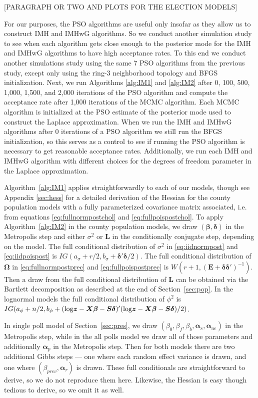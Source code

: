 \documentclass[12pt]{article}
\def\log{\hbox{log}}
\begin{document}
[PARAGRAPH OR TWO AND PLOTS FOR THE ELECTION MODELS]

For our purposes, the PSO algorithms are useful only insofar as they allow us to construct IMH and IMHwG algorithms. So we conduct another simulation study to see when each algorithm gets close enough to the posterior mode for the IMH and IMHwG algorithms to have high acceptance rates. To this end we conduct another simulations study using the same 7 PSO algorithms from the previous study, except only using the ring-3 neighborhood topology and BFGS initialization. Next, we run Algorithms \ref{alg:IM1} and \ref{alg:IM2} after 0, 100, 500, 1,000, 1,500, and 2,000 iterations of the PSO algorithm and compute the acceptance rate after 1,000 iterations of the MCMC algorithm. Each MCMC algorithm is initialized at the PSO estimate of the posterior mode used to construct the Laplace approximation. When we run the IMH and IMHwG algorithms after 0 iterations of a PSO algorithm we still run the BFGS initialization, so this serves as a control to see if running the PSO algorithm is necessary to get reasonable acceptance rates. Additionally, we run each IMH and IMHwG algorithm with different choices for the degrees of freedom parameter in the Laplace approximation.

Algorithm~\ref{alg:IM1} applies straightforwardly to each of our models, though see Appendix \ref{sec:hess} for a detailed derivation of the Hessian for the county population models with a fully parameterized covariance matrix associated, i.e. from equations \eqref{eq:fullnormpostchol} and \eqref{eq:fullpoispostchol}. To apply Algorithm~\ref{alg:IM2} in the county population models, we draw $(\bm{\beta},\bm{\delta})$ in the Metropolis step and either $\sigma^2$ or $\bm{L}$ in the conditionally conjugate step, depending on the model. The full conditional distribution of $\sigma^2$ in \eqref{eq:iidnormpost} and \eqref{eq:iidpoispost} is $IG(a_{\sigma} + r/2, b_{\sigma} + \bm{\delta}'\bm{\delta}/2)$. The full conditional distribution of $\bm{\Omega}$ in \eqref{eq:fullnormpostprec} and \eqref{eq:fullpoispostprec} is $W(r + 1, (\bm{E} + \bm{\delta}\bm{\delta}')^{-1})$. Then a draw from the full conditional distribution of $\bm{L}$ can be obtained via the Bartlett decomposition as described at the end of Section~\ref{sec:pop}. In the lognormal models the full conditional distribution of $\phi^2$ is $IG(a_{\phi} + n/2, b_{\phi} + (\log \bm{z} - \bm{X}\bm{\beta} - \bm{S}\bm{\delta})'(\log \bm{z} - \bm{X}\bm{\beta} - \bm{S}\bm{\delta})/2)$. 

In single poll model of Section~\ref{sec:pres}, we draw $(\beta_0, \beta_f, \beta_b, \bm{\alpha}_{s}, \bm{\alpha}_{ae})$ in the Metropolis step, while in the all polls model we draw all of those parameters and additionally $\bm{\alpha}_p$ in the Metropolis step. Then for both models there are two additional Gibbs steps --- one where each random effect variance is drawn, and one where $(\beta_{prev}, \bm{\alpha}_r)$ is drawn. These full conditionals are straightforward to derive, so we do not reproduce them here. Likewise, the Hessian is easy though tedious to derive, so we omit it as well.
\end{document}
